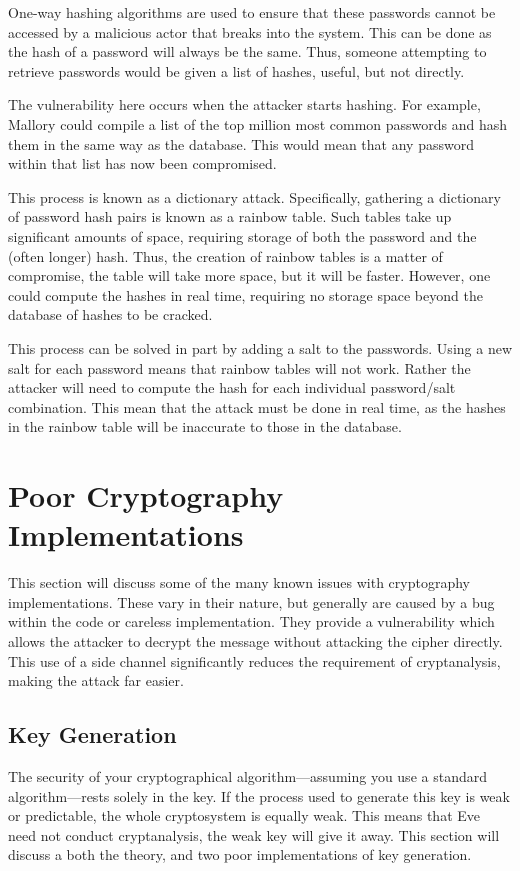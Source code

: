 		One-way hashing algorithms are used to ensure that these passwords cannot be accessed by a malicious actor that breaks into the system.
		This can be done as the hash of a password will always be the same.
		Thus, someone attempting to retrieve passwords would be given a list of hashes, useful, but not directly.

		The vulnerability here occurs when the attacker starts hashing.
		For example, Mallory could compile a list of the top million most common passwords and hash them in the same way as the database.
		This would mean that any password within that list has now been compromised.

		This process is known as a dictionary attack.
		Specifically, gathering a dictionary of password hash pairs is known as a rainbow table.
		Such tables take up significant amounts of space, requiring storage of both the password and the (often longer) hash.
		Thus, the creation of rainbow tables is a matter of compromise, the table will take more space, but it will be faster.
		However, one could compute the hashes in real time, requiring no storage space beyond the database of hashes to be cracked.

		This process can be solved in part by adding a salt to the passwords.
		Using a new salt for each password means that rainbow tables will not work.
		Rather the attacker will need to compute the hash for each individual password/salt combination.
		This mean that the attack must be done in real time, as the hashes in the rainbow table will be inaccurate to those in the database.
	\section{Poor Cryptography Implementations}
		This section will discuss some of the many known issues with cryptography implementations.
		These vary in their nature, but generally are caused by a bug within the code or careless implementation.
		They provide a vulnerability which allows the attacker to decrypt the message without attacking the cipher directly.
		This use of a side channel significantly reduces the requirement of cryptanalysis, making the attack far easier.
		\subsection{Key Generation}
			The security of your cryptographical algorithm---assuming you use a standard algorithm---rests solely in the key.
			If the process used to generate this key is weak or predictable, the whole cryptosystem is equally weak.
			This means that Eve need not conduct cryptanalysis, the weak key will give it away.
			This section will discuss a both the theory, and two poor implementations of key generation.

